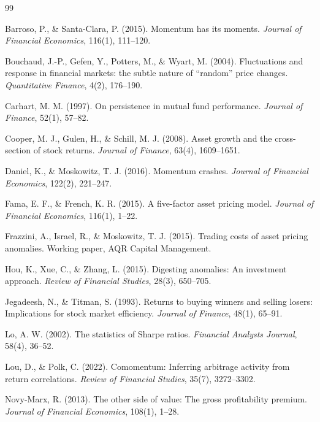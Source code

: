 \documentclass[11pt,a4paper]{article}
\begin{document}
\begin{thebibliography}{99}
\small

Barroso, P., \& Santa-Clara, P. (2015). Momentum has its moments.
\emph{Journal of Financial Economics}, 116(1), 111--120.

Bouchaud, J.-P., Gefen, Y., Potters, M., \& Wyart, M. (2004). Fluctuations
and response in financial markets: the subtle nature of ``random'' price
changes. \emph{Quantitative Finance}, 4(2), 176--190.

Carhart, M. M. (1997). On persistence in mutual fund performance.
\emph{Journal of Finance}, 52(1), 57--82.

Cooper, M. J., Gulen, H., \& Schill, M. J. (2008). Asset growth and the
cross-section of stock returns. \emph{Journal of Finance}, 63(4), 1609--1651.

Daniel, K., \& Moskowitz, T. J. (2016). Momentum crashes. \emph{Journal of
Financial Economics}, 122(2), 221--247.

Fama, E. F., \& French, K. R. (2015). A five-factor asset pricing model.
\emph{Journal of Financial Economics}, 116(1), 1--22.

Frazzini, A., Israel, R., \& Moskowitz, T. J. (2015). Trading costs of asset
pricing anomalies. Working paper, AQR Capital Management.

Hou, K., Xue, C., \& Zhang, L. (2015). Digesting anomalies: An investment
approach. \emph{Review of Financial Studies}, 28(3), 650--705.

Jegadeesh, N., \& Titman, S. (1993). Returns to buying winners and selling
losers: Implications for stock market efficiency. \emph{Journal of Finance},
48(1), 65--91.

Lo, A. W. (2002). The statistics of Sharpe ratios. \emph{Financial Analysts
Journal}, 58(4), 36--52.

Lou, D., \& Polk, C. (2022). Comomentum: Inferring arbitrage activity from
return correlations. \emph{Review of Financial Studies}, 35(7), 3272--3302.

Novy-Marx, R. (2013). The other side of value: The gross profitability
premium. \emph{Journal of Financial Economics}, 108(1), 1--28.


\end{thebibliography}
\end{document}
